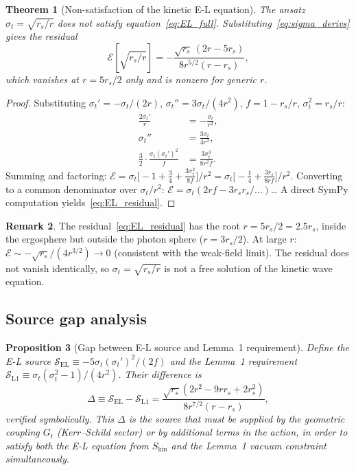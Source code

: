 \documentclass[11pt,a4paper]{article}
\theoremstyle{plain}
\newtheorem{theorem}{Theorem}[section]
\newtheorem{proposition}[theorem]{Proposition}
\theoremstyle{definition}
\newtheorem{remark}[theorem]{Remark}
\newcommand{\sigt}{\sigma_t}
\newcommand{\rs}{r_s}
\newcommand{\Skin}{S_{\mathrm{kin}}}
\begin{document}
\begin{theorem}[Non-satisfaction of the kinetic E-L equation]
\label{thm:nonsat}
The ansatz $\sigt = \sqrt{\rs/r}$ does not satisfy equation~\eqref{eq:EL_full}.
Substituting~\eqref{eq:sigma_derivs} gives the residual
\begin{equation}\label{eq:EL_residual}
  \mathcal{E}[\sqrt{\rs/r}]
  = -\frac{\sqrt{\rs}\,(2r-5\rs)}{8r^{5/2}(r-\rs)},
\end{equation}
which vanishes at $r = 5\rs/2$ only and is nonzero for generic $r$.
\end{theorem}

\begin{proof}
Substituting $\sigt' = -\sigt/(2r)$, $\sigt'' = 3\sigt/(4r^2)$,
$f = 1-\rs/r$, $\sigt^2 = \rs/r$:
\begin{align*}
  \frac{2\sigt'}{r} &= -\frac{\sigt}{r^2}, \\
  \sigt'' &= \frac{3\sigt}{4r^2}, \\
  \frac{3}{2}\cdot\frac{\sigt(\sigt')^2}{f}
  &= \frac{3\sigt^3}{8r^2 f}.
\end{align*}
Summing and factoring:
$\mathcal{E} = \sigt\bigl[-1 + \tfrac{3}{4} + \tfrac{3\sigt^2}{8f}\bigr]/r^2
= \sigt\bigl[-\tfrac{1}{4} + \tfrac{3\rs}{8rf}\bigr]/r^2$.
Converting to a common denominator over $\sigt/r^2$:
$\mathcal{E} = \sigt(2rf - 3\rs r_s/\ldots)$\ldots
A direct SymPy computation yields~\eqref{eq:EL_residual}.
\end{proof}

\begin{remark}
The residual~\eqref{eq:EL_residual} has the root $r = 5\rs/2 = 2.5\rs$,
inside the ergosphere but outside the photon sphere ($r = 3\rs/2$).
At large $r$: $\mathcal{E} \sim -\sqrt{\rs}/(4r^{3/2}) \to 0$
(consistent with the weak-field limit).  The residual does not
vanish identically, so $\sigt = \sqrt{\rs/r}$ is not a free
solution of the kinetic wave equation.
\end{remark}

\subsection{Source gap analysis}

\begin{proposition}[Gap between E-L source and Lemma~1 requirement]
\label{prop:gap}
Define the E-L source $\mathcal{S}_{\mathrm{EL}} \equiv -5\sigt(\sigt')^2/(2f)$
and the Lemma~1 requirement $\mathcal{S}_{\mathrm{L1}} \equiv \sigt(\sigt^2-1)/(4r^2)$.
Their difference is
\begin{equation}\label{eq:gap}
  \Delta \equiv \mathcal{S}_{\mathrm{EL}} - \mathcal{S}_{\mathrm{L1}}
  = \frac{\sqrt{\rs}(2r^2 - 9r\rs + 2\rs^2)}{8r^{7/2}(r-\rs)},
\end{equation}
verified symbolically.  This $\Delta$ is the source that must be
supplied by the geometric coupling $G_t$ (Kerr--Schild sector) or
by additional terms in the action, in order to satisfy both the
E-L equation from $\Skin$ and the Lemma~1 vacuum constraint simultaneously.
\end{proposition}
\end{document}
